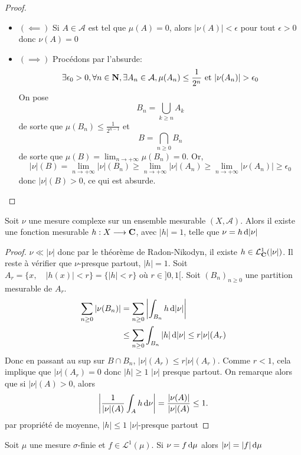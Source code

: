 \begin{proof}~
\begin{itemize}
    \item $(\impliedby )$ Si $A \in  \mathcal  A$ est tel que $\mu(A)=0$, alors  $|\nu(A)|<\epsilon$ pour tout $ \epsilon>0$ donc $\nu(A)=0$
    \item  $(\implies )$ Procédons par l'absurde: \[
            \exists  \epsilon_0>0, \forall  n \in  \mathbf N, \exists  A_n \in  \mathcal  A, \mu(A_n)\leq \frac1{2^n}\text{ et } |\nu(A_n)| >\epsilon_0
    \] 
    On pose \[B_n=\bigcup_{k\geq n}A_k\] de sorte que $\mu(B_n)\leq \frac1{2^{n-1}}$ et \[
    B = \bigcap_{n\geq 0}B_n
    \] 
    de sorte que $\mu(B)=\lim_{n\to +\infty} \mu\left( B_n \right) =0$. Or, \[
        |\nu|(B)=\lim_{n\to +\infty}|\nu|(B_n)\geq \lim_{n\to +\infty} |\nu|(A_n)\geq \lim_{n\to +\infty} |\nu(A_n)|\geq \epsilon_0
    \] 
    donc $|\nu|(B)>0$, ce qui est absurde.
\end{itemize}
\end{proof}

\begin{thm}
    Soit $\nu$ une mesure complexe sur un ensemble mesurable $(X, \mathcal  A)$. Alors il existe une fonction mesurable $h : X \longrightarrow \mathbf C$, avec $|h|=1$, telle que $\nu=h\mathop{}\!\mathrm d |\nu|$
\end{thm}

\begin{proof}
    $\nu\ll|\nu|$ donc par le théorème de Radon-Nikodyn, il existe  $h \in  \mathcal  L^1_{\mathbf C}(|\nu|)$. Il reste à vérifier que $\nu$-presque partout,  $|h|=1$. 
    Soit $A_r=\{x, \quad  |h(x)|<r\}= \{|h|<r\}$ où $r\in ]0,1[$. Soit $(B_n)_{n\geq 0}$ une partition mesurable de $A_r$.
    \begin{align*}
        \sum_{n\geq 0}|\nu(B_n)| &= \sum_{n\geq 0}\left| \int_{B_n}h\mathop{}\!\mathrm d|\nu|\right|\\
&\leq \sum_{n\geq0}\int_{B_n}|h|\mathop{}\!\mathrm d|\nu|\leq r|\nu|(A_r)
\end{align*}  
Donc en passant au sup sur $B\cap B_n$, $|\nu|(A_r)\leq r|\nu|(A_r)$.
Comme $r<1$, cela implique que $|\nu|(A_r)=0$ donc $|h|\geq 1$ $|\nu|$ presque partout.
On remarque alors que si $|\nu|(A)>0$, alors \[ \left| \frac{1}{|\nu|(A)}\int_Ah\mathop{}\!\mathrm d\nu\right| = \frac{|\nu(A)|}{|\nu|(A)}\leq 1.\]
par propriété de moyenne,  $|h|\leq 1$ $|\nu|$-presque partout %
\end{proof}

\begin{cor}
    Soit $\mu$ une mesure  $\sigma$-finie et  $f \in  \mathcal  L^1(\mu)$. Si $\nu=f\mathop{}\!\mathrm d\mu$ alors  $|\nu|=|f|\mathop{}\!\mathrm d \mu$
\end{cor}

